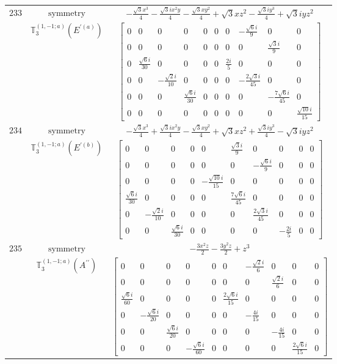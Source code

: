 \documentclass[fleqn,8pt,landscape]{jsarticle}
\begin{document}
\begin{longtable}{ccc}
$ 233 $ & $ \text{symmetry} $ & $ - \frac{\sqrt{3} x^{3}}{4} - \frac{\sqrt{3} i x^{2} y}{4} - \frac{\sqrt{3} x y^{2}}{4} + \sqrt{3} x z^{2} - \frac{\sqrt{3} i y^{3}}{4} + \sqrt{3} i y z^{2} $ \\
$  $ & $ \mathbb{T}_{3}^{(1,-1;a)}(E^{\prime(a)}) $ & $ \begin{bmatrix} 0 & 0 & 0 & 0 & 0 & 0 & 0 & - \frac{\sqrt{6} i}{9} & 0 & 0 \\ 0 & 0 & 0 & 0 & 0 & 0 & 0 & 0 & \frac{\sqrt{3} i}{9} & 0 \\ 0 & \frac{\sqrt{6} i}{30} & 0 & 0 & 0 & 0 & \frac{2 i}{5} & 0 & 0 & 0 \\ 0 & 0 & - \frac{\sqrt{2} i}{10} & 0 & 0 & 0 & 0 & - \frac{2 \sqrt{3} i}{45} & 0 & 0 \\ 0 & 0 & 0 & \frac{\sqrt{6} i}{30} & 0 & 0 & 0 & 0 & - \frac{7 \sqrt{6} i}{45} & 0 \\ 0 & 0 & 0 & 0 & 0 & 0 & 0 & 0 & 0 & \frac{\sqrt{10} i}{15} \end{bmatrix} $ \\ \hline
$ 234 $ & $ \text{symmetry} $ & $ - \frac{\sqrt{3} x^{3}}{4} + \frac{\sqrt{3} i x^{2} y}{4} - \frac{\sqrt{3} x y^{2}}{4} + \sqrt{3} x z^{2} + \frac{\sqrt{3} i y^{3}}{4} - \sqrt{3} i y z^{2} $ \\
$  $ & $ \mathbb{T}_{3}^{(1,-1;a)}(E^{\prime(b)}) $ & $ \begin{bmatrix} 0 & 0 & 0 & 0 & 0 & \frac{\sqrt{3} i}{9} & 0 & 0 & 0 & 0 \\ 0 & 0 & 0 & 0 & 0 & 0 & - \frac{\sqrt{6} i}{9} & 0 & 0 & 0 \\ 0 & 0 & 0 & 0 & - \frac{\sqrt{10} i}{15} & 0 & 0 & 0 & 0 & 0 \\ \frac{\sqrt{6} i}{30} & 0 & 0 & 0 & 0 & \frac{7 \sqrt{6} i}{45} & 0 & 0 & 0 & 0 \\ 0 & - \frac{\sqrt{2} i}{10} & 0 & 0 & 0 & 0 & \frac{2 \sqrt{3} i}{45} & 0 & 0 & 0 \\ 0 & 0 & \frac{\sqrt{6} i}{30} & 0 & 0 & 0 & 0 & - \frac{2 i}{5} & 0 & 0 \end{bmatrix} $ \\ \hline
$ 235 $ & $ \text{symmetry} $ & $ - \frac{3 x^{2} z}{2} - \frac{3 y^{2} z}{2} + z^{3} $ \\
$  $ & $ \mathbb{T}_{3}^{(1,-1;a)}(A^{\prime\prime}) $ & $ \begin{bmatrix} 0 & 0 & 0 & 0 & 0 & 0 & - \frac{\sqrt{2} i}{6} & 0 & 0 & 0 \\ 0 & 0 & 0 & 0 & 0 & 0 & 0 & \frac{\sqrt{2} i}{6} & 0 & 0 \\ \frac{\sqrt{6} i}{60} & 0 & 0 & 0 & 0 & \frac{2 \sqrt{6} i}{15} & 0 & 0 & 0 & 0 \\ 0 & - \frac{\sqrt{6} i}{20} & 0 & 0 & 0 & 0 & - \frac{4 i}{15} & 0 & 0 & 0 \\ 0 & 0 & \frac{\sqrt{6} i}{20} & 0 & 0 & 0 & 0 & - \frac{4 i}{15} & 0 & 0 \\ 0 & 0 & 0 & - \frac{\sqrt{6} i}{60} & 0 & 0 & 0 & 0 & \frac{2 \sqrt{6} i}{15} & 0 \end{bmatrix} $ \\ \hline

\end{longtable}
\end{document}

